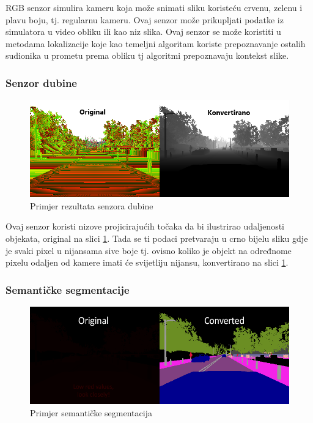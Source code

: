 RGB senzor simulira kameru koja može snimati sliku koristeću crvenu, zelenu i plavu boju, tj. regularnu kameru. Ovaj senzor može prikupljati podatke iz simulatora u video obliku ili kao niz slika. Ovaj senzor se može koristiti u metodama lokalizacije koje kao temeljni algoritam koriste prepoznavanje ostalih sudionika u prometu prema obliku tj algoritmi prepoznavaju kontekst slike.

\subsubsection{Senzor dubine}
\begin{figure}[ht!]
  \centering
  \includegraphics[scale=0.5]{images/depth_example.png}
  \caption{Primjer rezultata senzora dubine\cite{carla:sensors}}
  \label{fig:depth_exmaple}
\end{figure}

Ovaj senzor koristi nizove projicirajućih točaka da bi ilustrirao udaljenosti objekata, original na slici \ref{fig:depth_exmaple}. Tada se ti podaci pretvaraju u crno bijelu sliku gdje je svaki pixel u nijansama sive boje tj. ovisno koliko je objekt na određnome pixelu odaljen od kamere imati će svijetliju nijansu, konvertirano na slici \ref{fig:depth_exmaple}.

\newpage
\subsubsection{Semantičke segmentacije}
\begin{figure}[ht!]
  \centering
  \includegraphics[scale=0.5]{images/sem_seg_exmaple.png}
  \caption{Primjer semantičke segmentacija\cite{carla:sensors}}
  \label{fig:sem_seg_exmaple}
\end{figure}


